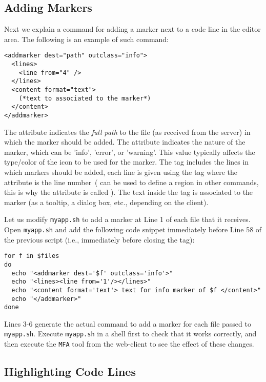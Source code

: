 \subsection{Adding Markers}

Next we explain a command for adding a marker next to a code line in
the editor area. The following is an example of such command:

\medskip
\begin{lstlisting}
<addmarker dest="path" outclass="info">
  <lines>
    <line from="4" />
  </lines>
  <content format="text">
    (*text to associated to the marker*)
  </content>
</addmarker>
\end{lstlisting}

\medskip
\noindent
The attribute  indicates the \emph{full path} to the file
(as received from the server) in which the marker should be added.
%
The attribute  indicates the nature of the marker, which
can be 'info', 'error', or 'warning'. This value typically affects the
type/color of the icon to be used for the marker.
%
The tag  includes the lines in which markers should be
added, each line is given using the tag  where the 
attribute is the line number~( can be used to define a
region in other commands, this is why the attribute is called
).
%
The text inside the  tag is associated to the marker (as
a tooltip, a dialog box, etc., depending on the client).

Let us modify \texttt{myapp.sh} to add a marker at Line 1 of each file
that it receives. Open \texttt{myapp.sh} and add the following code
snippet immediately before Line 58 of the previous script (i.e.,
immediately before closing the  tag):

\medskip
\begin{lstlisting}[style=script]
for f in $files 
do
  echo "<addmarker dest='$f' outclass='info'>"
  echo "<lines><line from='1'/></lines>"
  echo "<content format='text'> text for info marker of $f </content>"
  echo "</addmarker>"
done
\end{lstlisting}

\medskip
\noindent
Lines 3-6 generate the actual command to add a marker for each file
passed to \texttt{myapp.sh}.
%
Execute \texttt{myapp.sh} in a shell first to check that it works
correctly, and then execute the \texttt{MFA} tool from the
web-client to see the effect of these changes.

\subsection{Highlighting Code Lines}

